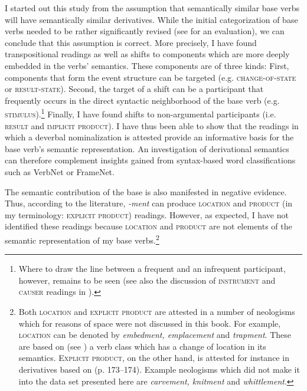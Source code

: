 I started out this study from the assumption that semantically similar base verbs will have semantically similar derivatives. While the initial categorization of base verbs needed to be rather significantly revised (see  for an evaluation), we can conclude that this assumption is correct. 
More precisely, I have found transpositional readings as well as shifts to components which are more deeply embedded in the verbs' semantics. These components are of three kinds:
First, components that form the event structure can be targeted (e.g. \textsc{change-of-state} or \textsc{result-state}).
Second, the target of a shift can be a participant that frequently occurs in the direct syntactic neighborhood of the base verb (e.g. \textsc{stimulus}).\footnote{Where to draw the line between a frequent and an infrequent participant, however, remains to be seen (see also the discussion of \textsc{instrument} and \textsc{causer} readings in ).}
Finally, I have found shifts to non-argumental participants (i.e. \textsc{result} and \textsc{implicit product}). I have thus been able to show that the readings in which a deverbal nominalization is attested provide an informative basis for the base verb's semantic representation. An investigation of derivational semantics can therefore complement insights gained from syntax-based word classifications such as VerbNet or FrameNet. 

The semantic contribution of the base is also manifested in negative evidence. Thus, according to the literature, \textit{-ment} can produce \textsc{location} and \textsc{product} (in my terminology: \textsc{explicit product}) readings. However, as expected, I have not identified these readings because \textsc{location} and \textsc{product} are not elements of the semantic representation of my base verbs.\footnote{Both \textsc{location} and \textsc{explicit product} are attested in a number of neologisms which for reasons of space were not discussed in this book. For example, \textsc{location} can be denoted by \textit{embedment, emplacement} and \textit{trapment}. These are based on  (see \citealt[111--122]{Levin.1993}) \textendash{} a verb class which has a change of location in its semantics.
\textsc{Explicit product}, on the other hand, is attested for instance in derivatives based on  (p. 173--174). Example neologisms which did not make it into the data set presented here are \textit{carvement, knitment} and \textit{whittlement}.}

